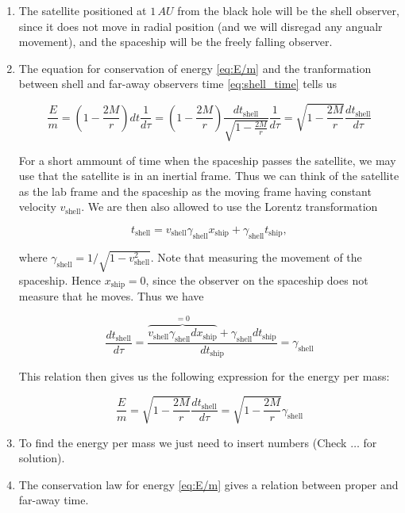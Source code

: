 \documentclass[a4paper,10pt,english]{article}
\begin{document}
\begin{enumerate}

\item The satellite positioned at $1\,AU$ from the black hole will be the shell observer, since it does not move in radial position (and we will disregad any angualr movement), and the  spaceship will be the freely falling observer.

\item The equation for conservation of energy \ref{eq:E/m} and the tranformation between shell and far-away observers time \ref{eq:shell_time} tells us 

\begin{equation*}
\frac{E}{m}=\left(1-\frac{2M}{r}\right)dt\frac{1}{d\tau}=\left(1-\frac{2M}{r}\right)\frac{dt_{\text{shell}}}{\sqrt{1-\frac{2M}{r}}}\frac{1}{d\tau}={\sqrt{1-\frac{2M}{r}}}\frac{dt_{\text{shell}}}{d\tau}
\end{equation*}

For a short ammount of time when the spaceship passes the satellite, we may use that the satellite is in an inertial frame. Thus we can think of the satellite as the lab frame and the spaceship as the moving frame having constant velocity $v_{\text{shell}}$. We are then also allowed to use the Lorentz transformation 

\[t_{\text{shell}}=v_{\text{shell}}\gamma_{\text{shell}}x_{\text{ship}}+\gamma_{\text{shell}}t_{\text{ship}},\]

where $\gamma_{\text{shell}}=1/\sqrt{1-v_{\text{shell}}^{2}}$. Note that measuring the movement of the spaceship. Hence $x_{\text{ship}}=0$, since the observer on the spaceship does not measure that he moves. Thus we have

\[\frac{dt_{\text{shell}}}{d\tau}=\frac{\overbrace{v_{\text{shell}}\gamma_{\text{shell}}dx_{\text{ship}}}^{=0}+\gamma_{\text{shell}}dt_{\text{ship}}}{dt_{\text{ship}}}=\gamma_{\text{shell}}\]

This relation then gives us the following expression for the energy per mass:

\begin{equation*}
\frac{E}{m}=\sqrt{1-\frac{2M}{r}}\frac{dt_{\text{shell}}}{d\tau}={\sqrt{1-\frac{2M}{r}}}\gamma_{\text{shell}}
\end{equation*}

\item To find the energy per mass we just need to insert numbers (Check $\ldots$ for solution).

\item The conservation law for energy \ref{eq:E/m} gives a relation between proper and far-away time.


\end{enumerate}
\end{document}
